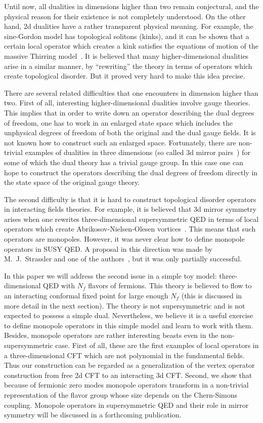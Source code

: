 \documentclass[a4paper,12pt, amsfonts, amssymb]{article}
\begin{document}
Until now, all dualities in dimensions
higher than two remain conjectural, and the physical reason for their existence is not completely understood. On the other hand, 2d dualities have a rather
transparent physical meaning. For example, the sine-Gordon model has
topological solitons (kinks), and it can be shown that a certain local
operator which creates a kink satisfies the equations of motion of the
massive Thirring model~\cite{Mandelstam}. 
It is believed that many higher-dimensional
dualities arise in a similar manner, by ``rewriting'' the theory in terms
of operators which create topological disorder. But it proved very hard
to make this idea precise. 

There are several related difficulties that one encounters in dimension
higher than two. First of all, interesting higher-dimensional
dualities involve gauge theories. This implies that in order to write
down an operator describing the dual degrees of freedom,
one has to work in an enlarged state space which includes the
unphysical degrees of freedom of both the original and the dual gauge fields. It is not known how to construct such an enlarged space.
Fortunately,
there are non-trivial examples of dualities in three dimensions 
(so called 3d mirror pairs~\cite{IS}) for some of which the dual theory has a 
trivial gauge group. In this case one can hope to construct the
operators describing the dual degrees of freedom directly in the 
state space of the original gauge theory. 

The second difficulty is that it is hard to construct
topological disorder operators in interacting fields theories. For
example, it is believed that 3d mirror symmetry arises when one
rewrites three-dimensional supersymmetric QED in terms of local operators 
which create Abrikosov-Nielsen-Olesen vortices~\cite{five}. 
This means that such operators are monopoles.
However, it was never clear how to define monopole operators in
SUSY QED. A proposal in this direction was made by M.~J.~Strassler and 
one of the authors~\cite{KS}, but it was only partially
successful.


In this paper we will address the second issue in a simple toy 
model: three-dimensional QED with $N_f$ flavors of fermions. 
This theory is believed to flow to an interacting conformal
fixed point for large enough $N_f$ (this is discussed in more detail in the
next section). The theory is not supersymmetric and is not expected to
possess a simple dual. Nevertheless, we believe it is a useful
exercise to define monopole operators in this simple model
and learn to work with them. Besides, monopole operators
are rather interesting beasts even in the non-supersymmetric
case. First of all, these are the first examples of local operators
in a three-dimensional CFT which are not polynomial in the fundamental
fields. Thus our construction can be regarded as a generalization of the
vertex operator construction from free 2d CFT to an interacting
3d CFT. Second, we show that because of fermionic zero modes
monopole operators transform in a non-trivial
representation of the flavor group whose size depends on the Chern-Simons
coupling. Monopole operators in supersymmetric QED and their role
in mirror symmetry will be discussed in a forthcoming publication.
\end{document}
